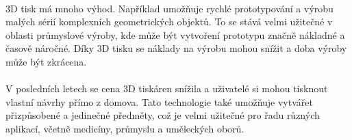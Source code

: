 \documentclass[12pt]{article}
\begin{document}
\begin{spacing}{1.5}
	\paragraph{} 3D tisk má mnoho výhod. Například umožňuje rychlé prototypování a výrobu malých sérií komplexních geometrických objektů. To se stává velmi užitečné v oblasti průmyslové výroby, kde může být vytvoření prototypu značně nákladné a časově náročné. Díky 3D tisku se náklady na výrobu mohou snížit a doba výroby může být zkrácena.
	
	\paragraph{} V posledních letech se cena 3D tiskáren snížila a uživatelé si mohou tisknout vlastní návrhy přímo z domova. Tato technologie také umožňuje vytvářet přizpůsobené a jedinečné předměty, což je velmi užitečné pro řadu různých aplikací, včetně medicíny, průmyslu a uměleckých oborů.
\end{spacing}
\end{document}
